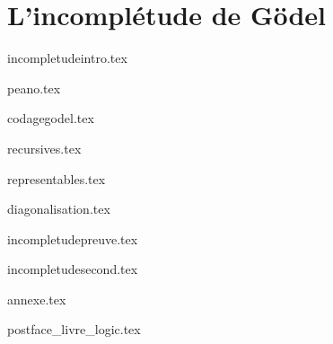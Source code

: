 \documentclass[11pt]{report}
\begin{document}
\part{L'incomplétude de Gödel}

{incompletudeintro.tex}

{peano.tex}

{codagegodel.tex}

{recursives.tex}

{representables.tex}

{diagonalisation.tex}

{incompletudepreuve.tex}

{incompletudesecond.tex}

	

{annexe.tex}

{postface_livre_logic.tex}

\vfill


\bigskip
\bigskip
\end{document}

